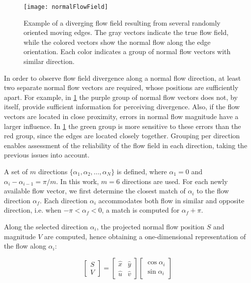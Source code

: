 \begin{figure}[!ht]
	\centering
	\texttt{[image: normalFlowField]}
	\caption{Example of a diverging flow field resulting from several randomly oriented moving edges. The gray vectors indicate the true flow field, while the colored vectors show the normal flow along the edge orientation. Each color indicates a group of normal flow vectors with similar direction.}
	\label{fig:normalFlowField}
\end{figure}

In order to observe flow field divergence along a normal flow direction, at least two separate normal flow vectors are required, whose positions are sufficiently apart. For example, in \cref{fig:normalFlowField} the purple group of normal flow vectors does not, by itself, provide sufficient information for perceiving divergence. Also, if the flow vectors are located in close proximity, errors in normal flow magnitude have a larger influence. In \cref{fig:normalFlowField} the green group is more sensitive to these errors than the red group, since the edges are located closely together. Grouping per direction enables assessment of the reliability of the flow field in each direction, taking the previous issues into account.

A set of $m$ directions $\lbrace\alpha_1,\alpha_2,\ldots,\alpha_N\rbrace$ is defined, where $\alpha_1=0$ and $\alpha_i-\alpha_{i-1} = \pi/m$. In this work, $m=6$ directions are used. For each newly available flow vector, we first determine the closest match of $\alpha_i$ to the flow direction $\alpha_f$. Each direction $\alpha_i$ accommodates both flow in similar and opposite direction, i.e. when $-\pi<\alpha_f<0$, a match is computed for $\alpha_f + \pi$. 

Along the selected direction $\alpha_i$, the projected normal flow position $S$ and magnitude $V$ are computed, hence obtaining a one-dimensional representation of the flow along $\alpha_i$:

\begin{equation}
\label{eq:transform_flow_field}
\left[ {\begin{array}{*{20}{c}}
	S\\
	V
	\end{array}} \right] = \left[ {\begin{array}{*{20}{c}}
	{\hat x}&{\hat y}\\
	{\hat u}&{\hat v}
	\end{array}} \right]\left[ {\begin{array}{*{20}{c}}
	{\cos \alpha_i }\\
	{\sin \alpha_i }
	\end{array}} \right]
\end{equation}

